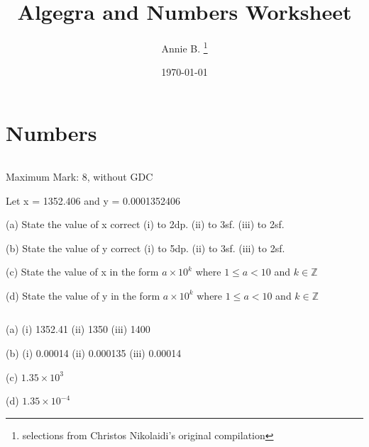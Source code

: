 \documentclass[12pt]{article}
\newenvironment{question}[2][Q]{\begin{trivlist}
\item[\hskip \labelsep {\bfseries #1}\hskip \labelsep {\bfseries #2.}]}{\end{trivlist}}
\newenvironment{answer}[2][A]{\begin{trivlist}
\item[\hskip \labelsep {\bfseries #1}\hskip \labelsep {\bfseries #2.}]}{\end{trivlist}}
\begin{document}
 
 
 
\title{Algegra and Numbers Worksheet}
\author{Annie B. \thanks{selections from Christos Nikolaidi's original compilation}}
\date{\today}
\maketitle

\section{Numbers}
\begin{question}{} $ $\newline
  
  Maximum Mark: 8, without GDC\newline
  
  Let x = 1352.406 and y = 0.0001352406\newline
  
  (a) State the value of x correct
      (i)   to 2dp.
      (ii)  to 3sf.
      (iii) to 2sf.\newline
  
  (b) State the value of y correct
      (i)   to 5dp.
      (ii)  to 3sf.
      (iii) to 2sf.\newline
  
  (c) State the value of x in the form $a \times 10^{k}$  where $1 \leq a < 10$ and  $k \in \mathbb{Z}$\newline
  
  (d) State the value of y in the form $a \times 10^{k}$  where $1 \leq a < 10$ and  $k \in \mathbb{Z}$\newline
  
\end{question}

\begin{answer}{} $ $\newline

  (a) (i) 1352.41 (ii) 1350 (iii) 1400\newline
  
  (b) (i) 0.00014 (ii) 0.000135 (iii) 0.00014\newline
  
  (c) $1.35 \times 10^{3}$\newline
  
  (d) $1.35 \times 10^{-4}$
  
\end{answer}
\end{document}
